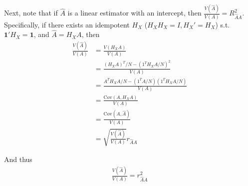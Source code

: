 \documentclass[40pt]{article}
\begin{document}


Next, note that if $\hat{A}$ is a linear estimator with an intercept, then $\frac{V(\hat{A})}{V(A)} = R_{\hat{A}A}^2$. Specifically, if there exists an idempotent $H_X$ ($H_XH_X=I, H_X'=H_X$) s.t. $\pmb{1}'H_X = \pmb{1}$, and $\hat{A} = H_XA$, then \\

\begin{align*}
    \frac{V(\hat{A})}{V(A)} &= \frac{V(H_XA)}{V(A)} \\
    &= \frac{(H_XA)^T/N - (1^TH_XA/N)^2}{V(A)} \\
    &= \frac{A^TH_XA/N - (1^TA/N)(1^TH_XA/N)}{V(A)} \\
    &= \frac{\text{Cov}(A, H_XA)}{V(A)} \\
    &= \frac{\text{Cov}(A,\hat{A})}{V(A)} \\
    &= \sqrt{\frac{V(\hat{A})}{V(A)}} r_{\hat{A}A}
\end{align*}
    
And thus
\begin{align*}
     \frac{V(\hat{A})}{V(A)} 
    = r_{\hat{A}A}^2
\end{align*}


\end{document}
